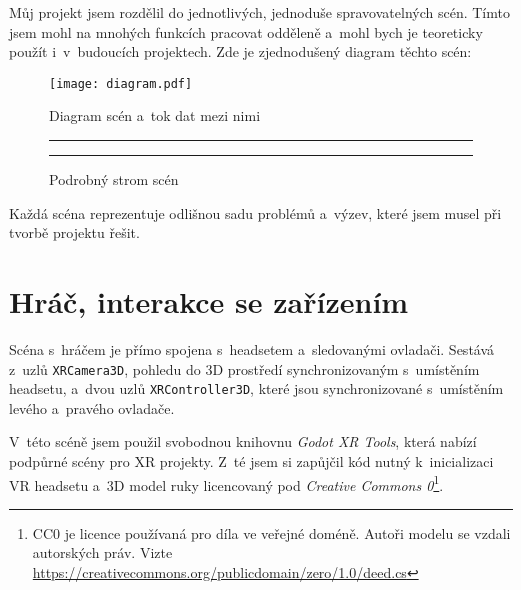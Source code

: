 \begin{samepage}
  Můj projekt jsem rozdělil do jednotlivých, jednoduše spravovatelných scén. Tímto jsem mohl na mnohých funkcích pracovat odděleně a~mohl bych je teoreticky použít i~v~budoucích projektech. Zde je zjednodušený diagram těchto scén:
  
  \begin{figure}[H]
    \centering
    \texttt{[image: diagram.pdf]}
    \caption{Diagram scén a~tok dat mezi nimi}
  \end{figure}
\end{samepage}


\begin{figure}[H]
  \vspace{1em}
  \hrule
  \vspace{1em}
  
  \renewcommand\DTstyle{\sffamily}
  \vspace{1em}
  \hrule
  \vspace{1em}
  \caption{Podrobný strom scén}
\end{figure}

Každá scéna reprezentuje odlišnou sadu problémů a~výzev, které jsem musel při tvorbě projektu řešit.

\section{Hráč, interakce se zařízením}

Scéna s~hráčem je přímo spojena s~headsetem a~sledovanými ovladači. Sestává z~uzlů \texttt{XRCamera3D}, pohledu do 3D prostředí synchronizovaným s~umístěním headsetu, a~dvou uzlů \texttt{XRController3D}, které jsou synchronizované s~umístěním levého a~pravého ovladače.

V~této scéně jsem použil svobodnou knihovnu \textit{Godot XR Tools}, která nabízí podpůrné scény pro XR projekty. Z~té jsem si zapůjčil kód nutný k~inicializaci VR headsetu a~3D model ruky licencovaný pod \textit{Creative Commons 0}\footnote{CC0 je licence používaná pro díla ve veřejné doméně. Autoři modelu se vzdali autorských práv. Vizte \url{https://creativecommons.org/publicdomain/zero/1.0/deed.cs}}.

